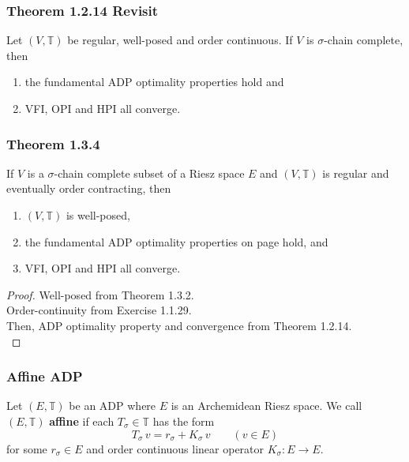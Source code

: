 \documentclass[11pt,xcolor={dvipsnames},hyperref={pdftex,pdfpagemode=UseNone,hidelinks,pdfdisplaydoctitle=true},usepdftitle=false]{beamer}
\begin{document}
\begin{frame}
\frametitle{Theorem 1.2.14 Revisit}
\begin{theorem}
    Let $(V, \mathbb{T})$ be regular, well-posed and order continuous. If $V$ is
    $\sigma$-chain complete, then
    \vspace{0.4em}
    \begin{enumerate}
        \item the fundamental ADP optimality properties hold and
        \item VFI, OPI and HPI all converge.  
    \end{enumerate}
\end{theorem}
\end{frame}
\begin{frame}
\frametitle{Theorem 1.3.4}
 If $V$ is a $\sigma$-chain complete subset of a Riesz space $E$ and
        $(V, \mathbb{T})$ is regular and eventually order contracting, then 
        \vspace{0.4em}
        \begin{enumerate}
            \item $(V,  \mathbb{T})$ is well-posed,
            \item the fundamental ADP optimality properties on
                page hold, and
            \item VFI, OPI and HPI all converge.  
        \end{enumerate}
\begin{proof}
Well-posed from Theorem 1.3.2.\\
Order-continuity from Exercise 1.1.29.\\
Then, ADP optimality property and convergence from Theorem 1.2.14.\\
\end{proof}
\end{frame}
\begin{frame}
\end{frame}

\begin{frame}
\frametitle{Affine ADP}
\begin{definition}
Let $(E, \mathbb{T})$ be an ADP where $E$ is an Archemidean Riesz space. We call $(E, \mathbb{T})$
\textbf{affine} if each $T_\sigma \in \mathbb{T}$ has the form
%
\begin{equation*}
    T_\sigma \, v = r_\sigma + K_\sigma \, v
    \qquad (v \in E)
\end{equation*}
%
for some $r_\sigma \in E$ and order continuous linear operator $K_\sigma \colon E \to E$.
\end{definition}
\end{frame}
\end{document}
